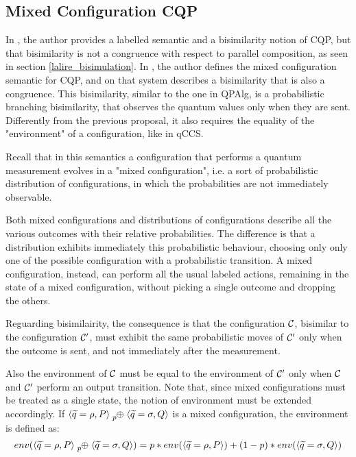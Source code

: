 \subsection{Mixed Configuration CQP}


In \cite{davidsonFormalVerificationTechniques2012}, the author provides a labelled semantic and a bisimilarity notion of CQP, but that bisimilarity is not a congruence with respect to parallel composition, as seen in section \ref{lalire_bisimulation}. In \cite{davidsonFormalVerificationTechniques2012}, the author defines the mixed configuration semantic for CQP, and on that system describes a bisimilarity that is also a congruence. This bisimilarity, similar to the one in QPAlg, is a probabilistic branching bisimilarity, that observes the quantum values only when they are sent. Differently from the previous proposal, it also requires the equality of the "environment" of a configuration, like in qCCS.


Recall that in this semantics a configuration that performs a quantum  measurement evolves in a "mixed configuration", i.e. a sort of probabilistic distribution of configurations, in which the probabilities are not immediately observable.  


Both mixed configurations and distributions of configurations describe all the various outcomes with their relative probabilities. The difference is that a distribution exhibits immediately this probabilistic behaviour, choosing only  only one of the possible configuration with a probabilistic transition. A mixed configuration, instead, can perform all the usual labeled actions, remaining in the state of a mixed configuration, without picking a single outcome and dropping the others.


Reguarding bisimilairity, the consequence is that the configuration $\mathcal{C}$, bisimilar to the configuration $\mathcal{C}'$, must exhibit the same probabilistic moves of $\mathcal{C}'$ only when the outcome is sent, and not immediately after the measurement.

Also the environment of $\mathcal{C}$ must be equal to the environment of $\mathcal{C}'$ only when $\mathcal{C}$ and $\mathcal{C}'$ perform an output transition. Note that, since mixed configurations must be treated as a single state, the notion of environment must be extended accordingly. If $\confw{\widetilde{q} = \rho, P} \psum{p} \confw{\widetilde{q} = \sigma, Q}$ is a mixed configuration, the environment is defined as:
\[env(\confw{\widetilde{q} = \rho, P} \psum{p} \confw{\widetilde{q} = \sigma, Q}) = p*env(\confw{\widetilde{q} = \rho, P}) + (1-p)*env(\confw{\widetilde{q} = \sigma, Q})\]

